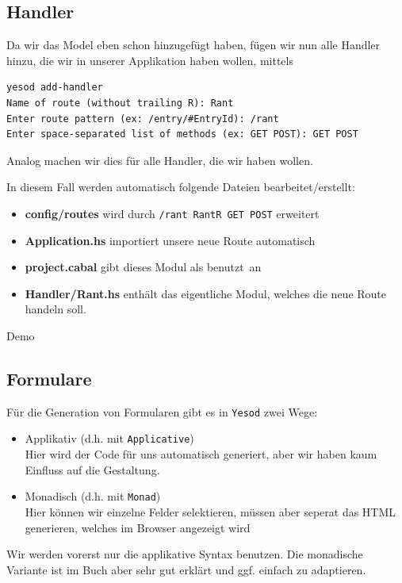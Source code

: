 \documentclass{beamer}
\begin{document}
\subsection{Handler}

\begin{frame}[fragile]
Da wir das Model eben schon hinzugefügt haben, fügen wir nun alle Handler hinzu, die wir in unserer Applikation haben wollen, mittels
\footnotesize
\begin{verbatim}
yesod add-handler
Name of route (without trailing R): Rant
Enter route pattern (ex: /entry/#EntryId): /rant
Enter space-separated list of methods (ex: GET POST): GET POST
\end{verbatim}
\normalsize
\pause
Analog machen wir dies für alle Handler, die wir haben wollen.\\\par\pause
In diesem Fall werden automatisch folgende Dateien bearbeitet/erstellt:
\begin{itemize}
 \item \textbf{config/routes} wird durch \texttt{/rant RantR GET POST} erweitert
 \pause
 \item \textbf{Application.hs} importiert unsere neue Route automatisch
 \pause
 \item \textbf{project.cabal} gibt dieses Modul als \glqq benutzt\grqq \ an
 \pause
 \item \textbf{Handler/Rant.hs} enthält das eigentliche Modul, welches die neue Route handeln soll.
\end{itemize}

\end{frame}

\begin{frame}
Demo
\end{frame}

\subsection{Formulare}

\begin{frame}[fragile]
Für die Generation von Formularen gibt es in \texttt{Yesod} zwei Wege:\pause
\begin{itemize}
 \item Applikativ (d.h. mit \texttt{Applicative})\pause\\
       Hier wird der Code für uns automatisch generiert, aber wir haben kaum Einfluss auf die Gestaltung.
 \pause
 \item Monadisch (d.h. mit \texttt{Monad})\pause\\
       Hier können wir einzelne Felder selektieren, müssen aber seperat das HTML generieren, welches im Browser angezeigt wird
\end{itemize}
\pause
Wir werden vorerst nur die applikative Syntax benutzen. Die monadische Variante ist im Buch aber sehr gut erklärt und ggf. einfach zu adaptieren.
\end{frame}
\end{document}
